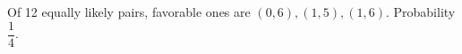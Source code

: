 Of 12 equally likely pairs, favorable ones are $(0,6),(1,5),(1,6)$. Probability $\boxed{\dfrac{1}{4}}$.
